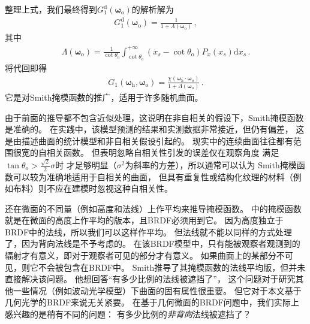 整理上式，我们最终得到$G_1^{\mathrm{d}}({\bm\omega}_{\mathrm{o}})$的解析解为
\begin{align}\label{eq:08-ex01-g1-d-solution}
    G_1^{\mathrm{d}}({\bm\omega}_{\mathrm{o}})=\frac{1}{1+\Lambda({\bm\omega}_{\mathrm{o}})}\, ,
\end{align}
其中
\begin{align}\label{eq:08-ex01-Lambda-function}
    \Lambda({\bm\omega}_{\mathrm{o}})=\frac{1}{\cot\theta_{\mathrm{o}}}
    \int_{\cot\theta_{\mathrm{o}}}^{+\infty}(x_s-\cot\theta_{\mathrm{o}})P_x(x_s)\mathrm{d}x_s\, .
\end{align}
将代回即得
\begin{align}\label{eq:08-ex01-Smith-masking-function}
    G_1({\bm\omega}_{\mathrm{h}},{\bm\omega}_{\mathrm{o}})
    =\frac{\chi({\bm\omega}_{\mathrm{h}}\cdot{\bm\omega}_{\mathrm{o}})}
    {1+\Lambda({\bm\omega}_{\mathrm{o}})}\, .
\end{align}
它是对Smith掩模函数的推广，适用于许多随机曲面。

由于前面的推导都不包含近似处理，这说明在非自相关的假设下，Smith掩模函数是准确的。
在实践中，该模型预测的结果和实测数据非常接近，但仍有偏差，
这是由描述曲面的统计模型和非自相关假设引起的。
现实中的连续曲面往往都有范围很宽的自相关函数。
但\citet{841905}表明忽略自相关性引发的误差仅在观察角度
满足$\tan\theta_{\mathrm{o}}>\frac{\sqrt{2}}{2}\sigma$时
才足够明显（$\sigma^2$为斜率的方差），所以通常可以认为
Smith掩模函数可以较为准确地适用于自相关的曲面，
但具有重复性或结构化纹理的材料（例如布料）则不应在建模时忽视这种自相关性。

\citet{1138991}还在微面的不同量（例如高度和法线）上作平均来推导掩模函数。
中的掩模函数
就是在微面的高度上作平均的版本，且BRDF必须用到它。
因为高度独立于BRDF中的法线，所以我们可以这样作平均。
但法线就不能以同样的方式处理了，因为背向法线是不予考虑的。
在该BRDF模型中，只有能被观察者观测到的辐射才有意义，即对于观察者可见的部分才有意义。
如果曲面上的某部分不可见，则它不会被包含在BRDF中。
Smith推导了其掩模函数的法线平均版，但并未直接解决该问题。
他想回答“有多少比例的法线被遮挡了”，
这个问题对于研究其他一些情况（例如波动光学模型）下曲面的固有属性很重要。
但它对于本文基于几何光学的BRDF来说无关紧要。
在基于几何微面的BRDF问题中，我们实际上感兴趣的是稍有不同的问题：
有多少比例的\emph{非背向}法线被遮挡了？


